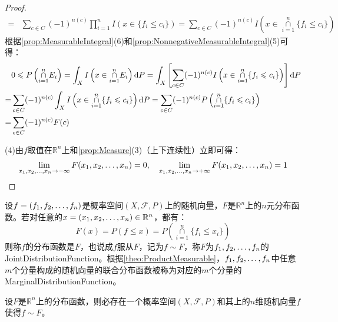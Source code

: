 \begin{proof}
\begin{align*}
		=&\sum_{c\in C}(-1)^{n(c)}\prod_{i=1}^{n}I(x\in\{f_i\leqslant c_i\})=\sum_{c\in C}(-1)^{n(c)}I\left(x\in\underset{i=1}{\overset{n}{\cap}}\{f_i\leqslant c_i\}\right)
	\end{align*}
	根据\cref{prop:MeasurableIntegral}(6)和\cref{prop:NonnegativeMeasurableIntegral}(5)可得：
	\begin{align*}
		&0\leqslant P\left(\underset{i=1}{\overset{n}{\cap}}E_i\right)=\int_{X}I\left(x\in\underset{i=1}{\overset{n}{\cap}}E_i\right)\mathop{}\!\mathrm{d} P=\int_{X}\left[\sum_{c\in C}(-1)^{n(c)}I\left(x\in\underset{i=1}{\overset{n}{\cap}}\{f_i\leqslant c_i\}\right)\right]\mathop{}\!\mathrm{d} P \\
		=&\sum_{c\in C}(-1)^{n(c)}\int_{X}I\left(x\in\underset{i=1}{\overset{n}{\cap}}\{f_i\leqslant c_i\}\right)\mathop{}\!\mathrm{d} P=\sum_{c\in C}(-1)^{n(c)}P\left(\underset{i=1}{\overset{n}{\cap}}\{f_i\leqslant c_i\}\right) \\
		=&\sum_{c\in C}(-1)^{n(c)}F(c)
	\end{align*}\par
	(4)由$f$取值在$\mathbb{R}^{n}$上和\cref{prop:Measure}(3)（上下连续性）立即可得：
	\begin{equation*}
		\lim_{x_1, x_2, \dots, x_{n}\to-\infty}F(x_1, x_2, \dots, x_{n})=0,\quad\lim_{x_1, x_2, \dots, x_{n}\to+\infty}F(x_1, x_2, \dots, x_{n})=1\qedhere
	\end{equation*}
\end{proof}
\begin{definition}
	设$f=(f_1, f_2, \dots, f_{n})$是概率空间$(X,\mathscr{F},P)$上的随机向量，$F$是$\mathbb{R}^{n}$上的$n$元分布函数。若对任意的$x=(x_1, x_2, \dots, x_{n})\in\mathbb{R}^{n}$，都有：
	\begin{equation*}
		F(x)=P(f\leqslant x)=P\left(\underset{i=1}{\overset{n}{\cap}}\{f_i\leqslant x_i\}\right)
	\end{equation*}
	则称$f$的分布函数是$F$，也说成$f$服从$F$，记为$f\sim F$，称$F$为$f_1, f_2, \dots, f_{n}$的\gls{JointDistributionFunction}。根据\cref{theo:ProductMeasurable}，$f_1, f_2, \dots, f_{n}$中任意$m$个分量构成的随机向量的联合分布函数被称为对应的$m$个分量的\gls{MarginalDistributionFunction}。
\end{definition}
\begin{property}
	设$F$是$\mathbb{R}^{n}$上的分布函数，则必存在一个概率空间$(X,\mathscr{F},P)$和其上的$n$维随机向量$f$使得$f\sim F$。
\end{property}

